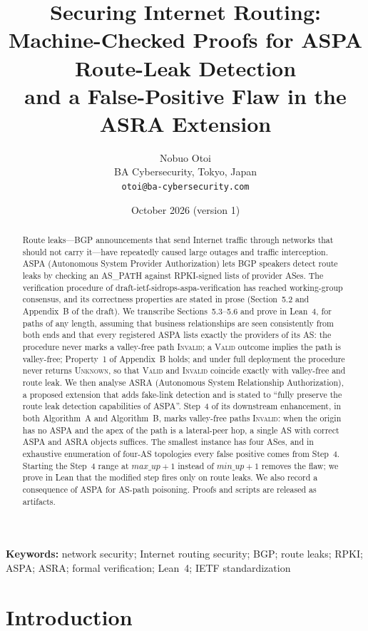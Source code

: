 \documentclass[11pt,a4paper]{article}
\title{Securing Internet Routing:\\Machine-Checked Proofs for ASPA Route-Leak Detection\\and a False-Positive Flaw in the ASRA Extension}
\author{Nobuo Otoi\\BA Cybersecurity, Tokyo, Japan\\\texttt{otoi@ba-cybersecurity.com}}
\date{October 2026 (version 1)}
\theoremstyle{definition}
\theoremstyle{remark}
\newcommand{\Valid}{\textup{\textsc{Valid}}}
\newcommand{\Invalid}{\textup{\textsc{Invalid}}}
\newcommand{\Unknown}{\textup{\textsc{Unknown}}}
\newcommand{\maxup}{\mathit{max\_up}}
\newcommand{\minup}{\mathit{min\_up}}
\begin{document}
\maketitle

\begin{abstract}
Route leaks---BGP announcements that send Internet traffic through networks that should not carry
it---have repeatedly caused large outages and traffic interception.
ASPA (Autonomous System Provider Authorization) lets BGP speakers detect route leaks by checking an
AS\_PATH against RPKI-signed lists of provider ASes. The verification procedure of
draft-ietf-sidrops-aspa-verification has reached working-group consensus, and its correctness
properties are stated in prose (Section~5.2 and Appendix~B of the draft).
We transcribe Sections~5.3--5.6 and prove in Lean~4, for paths of any length, assuming that business
relationships are seen consistently from both ends and that every registered ASPA lists exactly the
providers of its AS:
the procedure never marks a valley-free path \Invalid;
a \Valid{} outcome implies the path is valley-free;
Property~1 of Appendix~B holds;
and under full deployment the procedure never returns \Unknown, so that \Valid{} and \Invalid{} coincide
exactly with valley-free and route leak.
We then analyse ASRA (Autonomous System Relationship Authorization), a proposed extension that adds
fake-link detection and is stated to ``fully preserve the route leak detection capabilities of ASPA''.
Step~4 of its downstream enhancement, in both Algorithm~A and Algorithm~B, marks valley-free paths
\Invalid: when the origin has no ASPA and the apex of the path is a lateral-peer hop, a single AS with
correct ASPA and ASRA objects suffices. The smallest instance has four ASes, and in exhaustive
enumeration of four-AS topologies every false positive comes from Step~4.
Starting the Step~4 range at $\maxup+1$ instead of $\minup+1$ removes the flaw; we prove in Lean that
the modified step fires only on route leaks.
We also record a consequence of ASPA for AS-path poisoning.
Proofs and scripts are released as artifacts.
\end{abstract}

\noindent\textbf{Keywords:} network security; Internet routing security; BGP; route leaks; RPKI; ASPA; ASRA; formal verification; Lean~4; IETF standardization

\section{Introduction}
\end{document}
